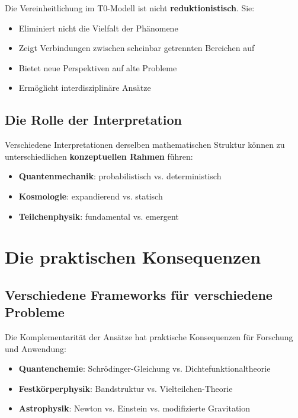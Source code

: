 \documentclass[12pt,a4paper]{report}
\begin{document}
	Die Vereinheitlichung im T0-Modell ist nicht \textbf{reduktionistisch}. Sie:
	
	\begin{itemize}
		\item Eliminiert nicht die Vielfalt der Phänomene
		\item Zeigt Verbindungen zwischen scheinbar getrennten Bereichen auf
		\item Bietet neue Perspektiven auf alte Probleme
		\item Ermöglicht interdisziplinäre Ansätze
	\end{itemize}
	
	\subsection{Die Rolle der Interpretation}
	
	Verschiedene Interpretationen derselben mathematischen Struktur können zu unterschiedlichen \textbf{konzeptuellen Rahmen} führen:
	
	\begin{itemize}
		\item \textbf{Quantenmechanik}: probabilistisch vs. deterministisch
		\item \textbf{Kosmologie}: expandierend vs. statisch
		\item \textbf{Teilchenphysik}: fundamental vs. emergent
	\end{itemize}
	
	\section{Die praktischen Konsequenzen}
	
	\subsection{Verschiedene Frameworks für verschiedene Probleme}
	
	Die Komplementarität der Ansätze hat praktische Konsequenzen für Forschung und Anwendung:
	
	\begin{itemize}
		\item \textbf{Quantenchemie}: Schrödinger-Gleichung vs. Dichtefunktionaltheorie
		\item \textbf{Festkörperphysik}: Bandstruktur vs. Vielteilchen-Theorie
		\item \textbf{Astrophysik}: Newton vs. Einstein vs. modifizierte Gravitation
	\end{itemize}
	
\end{document}
